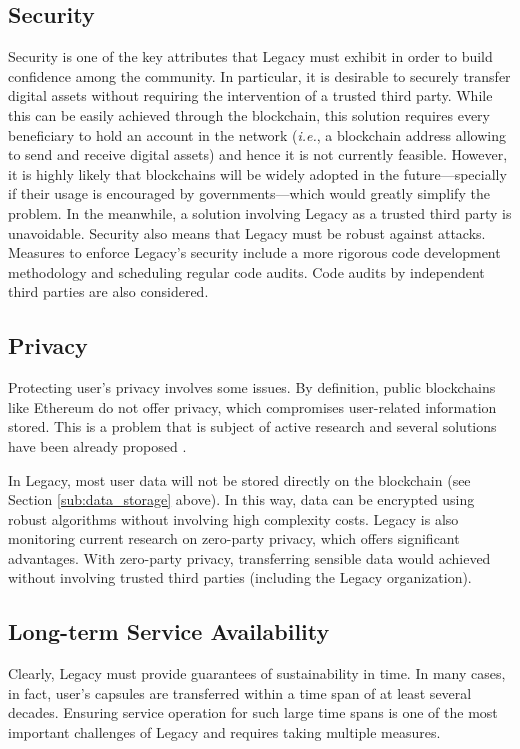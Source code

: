 


\subsection{Security} %
\label{sub:security}
Security is one of the key attributes that Legacy must exhibit in order to build confidence among the community. 
In particular, it is desirable to securely transfer digital assets without requiring the intervention of a trusted third party. 
While this can be easily achieved through the blockchain, this solution requires every beneficiary to hold an account in the network (\textit{i.e.}, a blockchain address allowing to send and receive digital assets) and hence it is not currently feasible.
However, it is highly likely that blockchains will be widely adopted in the future---specially if their usage is encouraged by governments---which would greatly simplify the problem.
In the meanwhile, a solution involving Legacy as a trusted third party is unavoidable.
Security also means that Legacy must be robust against attacks. Measures to enforce Legacy's security include a more rigorous code development methodology and scheduling regular code audits. Code audits by independent third parties are also considered.



\subsection{Privacy} %
\label{sub:privacy}
Protecting user's privacy involves some issues. By definition, public blockchains like Ethereum do not offer privacy, which compromises user-related information stored. This is a problem that is subject of active research and several solutions have been already proposed \cite{Buterin}. 

In Legacy, most user data will not be stored directly on the blockchain (see Section \ref{sub:data_storage} above). In this way, data can be encrypted using robust algorithms without involving high complexity costs.
Legacy is also monitoring current research on zero-party privacy, which offers significant advantages. With zero-party privacy, transferring sensible data would achieved without involving trusted third parties (including the Legacy organization).

\subsection{Long-term Service Availability} %
\label{sub:long_term_service_availability}
Clearly, Legacy must provide guarantees of sustainability in time. In many cases, in fact, user's capsules are transferred within a time span of at least several decades.  Ensuring service operation for such large time spans is one of the most important challenges of Legacy and requires taking multiple measures. 


